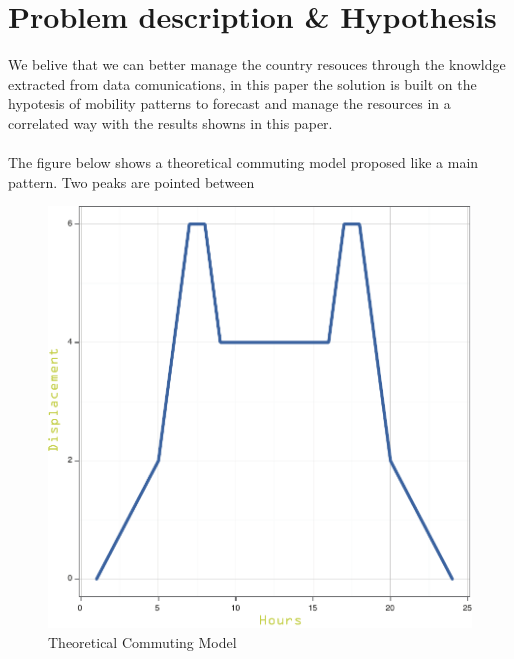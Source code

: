\newpage

\section{Problem description \& Hypothesis}
We belive that we can better manage  the country resouces through the knowldge extracted from data comunications, in this paper the solution is built on the hypotesis of mobility patterns to forecast and manage the resources in a correlated way with the results showns in this paper.
\\
\\
The figure below shows a theoretical commuting model proposed like a main pattern. Two peaks are pointed between 
 
 \begin{figure}[h]
\begin{center}
\includegraphics[scale =0.6] {results/images/common_commuting_model.pdf}
\caption{Theoretical Commuting Model}
\label{fig:commuting}
\end{center}
\end{figure}